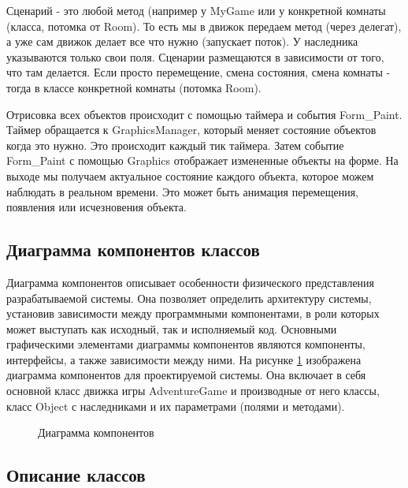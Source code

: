 Сценарий - это любой метод (например у MyGame или у конкретной комнаты (класса, потомка от Room).
То есть мы в движок передаем метод (через делегат), а уже сам движок делает все что нужно (запускает поток).
У наследника указываются только свои поля. Сценарии размещаются в зависимости от того, что там делается.
Если просто перемещение, смена состояния, смена комнаты - тогда в классе конкретной комнаты (потомка Room).

Отрисовка всех объектов происходит с помощью таймера и события Form\_Paint. Таймер обращается к GraphicsManager, который меняет состояние объектов когда это нужно. Это происходит каждый тик таймера. Затем событие Form\_Paint с помощью Graphics отображает измененные объекты на форме. На выходе мы получаем актуальное состояние каждого объекта, которое можем наблюдать в реальном времени. Это может быть анимация перемещения, появления или исчезновения объекта.


\subsection{Диаграмма компонентов классов}

Диаграмма компонентов описывает особенности физического представления разрабатываемой системы. Она позволяет определить архитектуру системы, установив зависимости между программными компонентами, в роли которых может выступать как исходный, так и исполняемый код. Основными графическими элементами диаграммы компонентов являются компоненты, интерфейсы, а также зависимости между ними. На рисунке \ref{diagram:image} изображена диаграмма компонентов для проектируемой системы. Она включает в себя основной класс движка игры AdventureGame и производные от него классы, класс Object с наследниками и их параметрами (полями и методами).

\begin{figure}[ht]
\caption{Диаграмма компонентов}
\label{diagram:image}
\end{figure}

\subsection{Описание классов}


